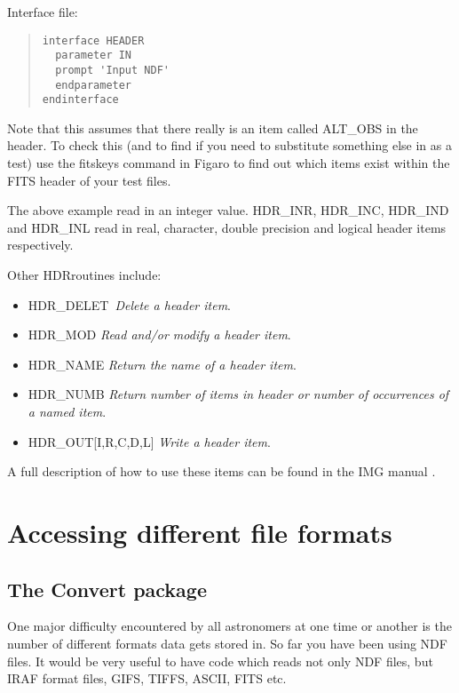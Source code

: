 Interface file:

\begin{quote}
{\small
\begin{verbatim}
interface HEADER
  parameter IN
  prompt 'Input NDF'
  endparameter
endinterface
\end{verbatim}
}
\end{quote}

Note that this assumes that there really is an item called {\sf ALT\_OBS}
in the header. To check this (and to find if you need to substitute
something else in as a test) use the {\sf fitskeys} command in {\sf
Figaro} to find out which items exist within the FITS header of your test
files.

The above example read in an integer value.  {\sf HDR\_INR}, {\sf
HDR\_INC}, {\sf HDR\_IND} and {\sf HDR\_INL} read in real, character,
double precision and logical header items respectively.

Other {\sf HDR}routines include:

\begin{itemize}
\item {\sf HDR\_DELET}\ {\em Delete a header item}.
\item {\sf HDR\_MOD} {\em Read and/or modify a header item}.
\item {\sf HDR\_NAME} {\em Return the name of a header item}.
\item {\sf HDR\_NUMB} {\em Return number of items in header or
number of occurrences of a named item}.
\item {\sf HDR\_OUT[I,R,C,D,L]} {\em Write a header item}.
\end{itemize}

A full description of how to use these items can be found in the IMG manual
.

\section{Accessing different file formats}

\subsection{The Convert package}

One major difficulty encountered by all astronomers at one time or another is
the number of different formats data gets stored in. So far you have been
using NDF files. It would be very useful to have code which reads not
only NDF files, but IRAF format files, GIFS, TIFFS, ASCII, FITS etc.

